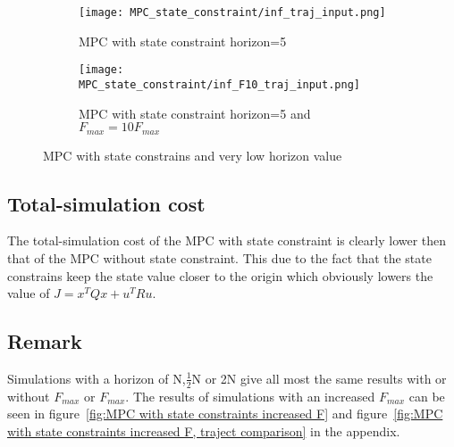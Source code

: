 	\begin{figure}[H]
		\centering
		\begin{subfigure}[b]{0.45\textwidth}
			\texttt{[image: MPC\_state\_constraint/inf\_traj\_input.png]}
			\caption{MPC with state constraint horizon=5}
			\label{fig:MPC state constraints N=5}
		\end{subfigure}
		\begin{subfigure}[b]{0.45\textwidth}
			\texttt{[image: MPC\_state\_constraint/inf\_F10\_traj\_input.png]}
			\caption{MPC with state constraint horizon=5 and $F_{max}=10 F_{max}$}
			\label{fig:MPC state constraints N=5 F=10F}
		\end{subfigure}
		\caption{MPC with state constrains and very low horizon value}
	\end{figure}
	
\subsection{Total-simulation cost}
	The total-simulation cost of the MPC with state constraint is clearly lower then that of the MPC without state constraint. This due to the fact that the state constrains keep the state value closer to the origin which obviously lowers the value of $J=x^TQx+u^TRu$.
	
	\begin{minipage}{\linewidth}
		\centering
		\label{tab:total-simulation cost MPC with state constrains} 
		
	\end{minipage}

\subsection{Remark}
	Simulations with a horizon of N,$\frac{1}{2}$N or 2N give all most the same results with or without $F_{max}$ or $F_{max}$. The results of simulations with an increased $F_{max}$ can be seen in figure~\ref{fig:MPC with state constraints increased F} and figure~\ref{fig:MPC with state constraints increased F, traject comparison} in the appendix.